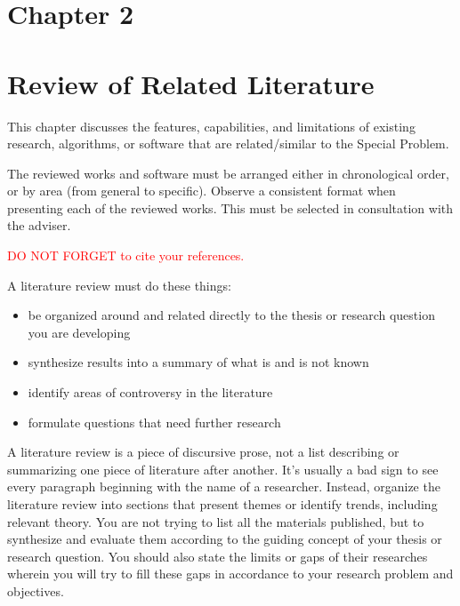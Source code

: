 \section*{Chapter 2}
\label{sec:relatedlit}
\section{Review of Related Literature}
\label{sec:relatedlit}

This chapter discusses the features, capabilities, and limitations of existing research, algorithms, or software  that are related/similar to the Special Problem.

 The reviewed works and software must be arranged either in chronological order, or by area (from general to specific).  
Observe a consistent format when presenting each of the reviewed works. 
This must be selected in consultation with the  adviser.


\textcolor{red}{DO NOT FORGET to cite your references.}

A literature review must do these things:
\begin{itemize}
	\item be organized around and related directly to the thesis or research question you are developing
	\item synthesize results into a summary of what is and is not known
	\item identify areas of controversy in the literature
	\item formulate questions that need further research
\end{itemize}

A literature review is a piece of discursive prose, not a list describing or summarizing one piece of literature after another. It’s usually a bad sign to see every paragraph beginning with the name of a researcher. Instead, organize the literature review into sections that present themes or identify trends, including relevant theory. You are not trying to list all the materials published, but to synthesize and evaluate them according to the guiding concept of your thesis or research question. You should also state the limits or gaps of their researches wherein you will try to fill these gaps in accordance to your research problem and objectives.



